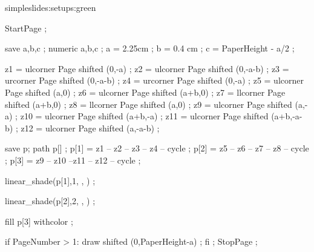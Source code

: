 \startsetups simpleslides:setups:green
\stopsetups


    {}
    {}



\unexpanded{}

StartPage ;

save a,b,c ; numeric a,b,c ;
a = 2.25cm ;
b = 0.4 cm ;
c = PaperHeight - a/2 ;

z1 = ulcorner Page shifted (0,-a) ;
z2 = ulcorner Page shifted (0,-a-b) ;
z3 = urcorner Page shifted (0,-a-b) ;
z4 = urcorner Page shifted (0,-a) ;
z5 = ulcorner Page shifted (a,0) ;
z6 = ulcorner Page shifted (a+b,0) ;
z7 = llcorner Page shifted (a+b,0) ;
z8 = llcorner Page shifted (a,0) ;
z9 = ulcorner Page shifted (a,-a) ;
z10 = ulcorner Page shifted (a+b,-a) ;
z11 = ulcorner Page shifted (a+b,-a-b) ;
z12 = ulcorner Page shifted (a,-a-b) ;

save p; path p[] ;
p[1] = z1 -- z2 -- z3 -- z4 -- cycle ;
p[2] = z5 -- z6 -- z7 -- z8 -- cycle ;
p[3] = z9 -- z10 --z11 -- z12 -- cycle ;

linear_shade(p[1],1,
             ,
             ) ;

linear_shade(p[2],2,
             ,
             ) ;

fill p[3] withcolor  ;

if PageNumber > 1:
	draw  shifted (0,PaperHeight-a) ;
fi ;
StopPage ;
\stopuseMPgraphic

